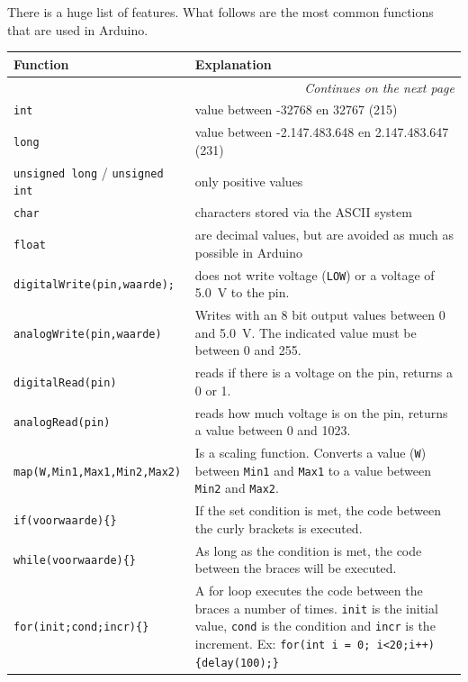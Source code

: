 \documentclass{arduino}
\begin{document}
\begin{minipage}{\widemargin}
There is a huge list of features. What follows are the most common functions that are used in Arduino.

\begin{longtable}{p{}p{}}
\toprule
\textbf{Function} & \textbf{Explanation} \\
\midrule\endhead
\midrule \multicolumn{2}{r}{{\scriptsize\textit{Continues on the next page}}} \\ \bottomrule
\endfoot
\bottomrule
\endlastfoot 
{\lstinline[]!int!} &
value between -32768 en 32767 (215) \\
{\lstinline[]!long!} &
value between -2.147.483.648 en 2.147.483.647 (231) \\
{\lstinline[]!unsigned long!} / {\lstinline[]!unsigned int!} &
only positive values \\
{\lstinline[]!char!} &
characters stored via the ASCII system \\
{\lstinline[]!float!} &
are decimal values, but are avoided as much as possible in Arduino \\
{\lstinline[]!digitalWrite(pin,waarde);!} &
does not write voltage ({\lstinline[]!LOW!}) or a voltage of \SI{5.0}{\volt} to the pin. \\
{\lstinline[]!analogWrite(pin,waarde)!} &
Writes with an 8 bit output values ​​between 0 and \SI{5.0}{\volt}. The indicated value must be between 0 and 255. \\
{\lstinline[]!digitalRead(pin)!} &
reads if there is a voltage on the pin, returns a 0 or 1. \\
{\lstinline[]!analogRead(pin)!} &
reads how much voltage is on the pin, returns a value between 0 and 1023. \\
{\lstinline[]!map(W,Min1,Max1,Min2,Max2)!} &
Is a scaling function. Converts a value ({\lstinline[]!W!}) between {\lstinline[]!Min1!} and {\lstinline[]!Max1!} to a value between {\lstinline[]!Min2!} and {\lstinline[]!Max2!}. \\
{\lstinline[]!if(voorwaarde){}!} &
If the set condition is met, the code between the curly brackets is executed. \\
{\lstinline[]!while(voorwaarde){}!} &
As long as the condition is met, the code between the braces will be executed. \\
{\lstinline[]!for(init;cond;incr){}!} &
A for loop executes the code between the braces a number of times. {\lstinline[]!init!} is the initial value, {\lstinline[]!cond!} is the condition and {\lstinline[]!incr!} is the increment. Ex: {\lstinline[]!for(int i = 0; i<20;i++){delay(100);}!} \\

\end{longtable}
\end{minipage}
\end{document}
